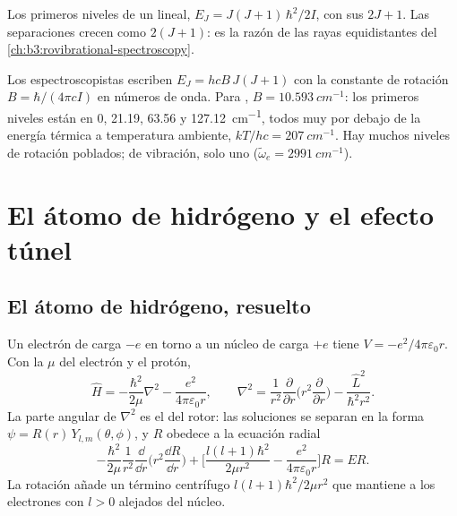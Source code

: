 \begin{omfigure}

{\small Los primeros niveles de un  lineal, $E_J = J(J+1)\,\hbar^2/2I$,
con sus  $2J + 1$. Las separaciones crecen como $2(J+1)$: es la razón
de las rayas equidistantes del \cref{ch:b3:rovibrational-spectroscopy}.}
\end{omfigure}

\begin{example}\label{ex:b3:quantum-model-systems:hcl}
Los espectroscopistas escriben $E_J = hcB\,J(J+1)$ con la constante de rotación $B =
\hbar/(4\pi cI)$ en números de onda. Para , $B = \qty{10.593}{cm^{-1}}$:
los primeros niveles están en 0, 21.19, 63.56 y \qty{127.12}{cm^{-1}}, todos muy
por debajo de la energía térmica a temperatura ambiente, $kT/hc = \qty{207}{cm^{-1}}$.
Hay muchos niveles de rotación poblados; de vibración, solo uno
($\tilde\omega_e = \qty{2991}{cm^{-1}}$).
\end{example}

\section{El átomo de hidrógeno y el efecto túnel}

\subsection*{El átomo de hidrógeno, resuelto}

Un electrón de carga $-e$ en torno a un núcleo de carga $+e$ tiene $V = -e^2/
4\pi\varepsilon_0r$. Con la  $\mu$ del electrón y el protón,
\[
\hat H = -\frac{\hbar^2}{2\mu}\nabla^2 - \frac{e^2}{4\pi\varepsilon_0r},\qquad
\nabla^2 = \frac{1}{r^2}\frac{\partial}{\partial r}\Big(r^2\frac{\partial}{
\partial r}\Big) - \frac{\hat L^2}{\hbar^2r^2}.
\]
La parte angular de $\nabla^2$ es el  del rotor: las soluciones se
separan en la forma $\psi = R(r)\,Y_{l,m}(\theta,\phi)$, y $R$ obedece a la ecuación
radial
\[
-\frac{\hbar^2}{2\mu}\frac{1}{r^2}\frac{\dd}{\dd r}\Big(r^2\frac{\dd R}{\dd r}
\Big) + \Big[\frac{l(l+1)\hbar^2}{2\mu r^2} - \frac{e^2}{4\pi\varepsilon_0r}
\Big]R = ER.
\]
La rotación añade un término centrífugo $l(l+1)\hbar^2/2\mu r^2$ que mantiene
a los electrones con $l > 0$ alejados del núcleo.

